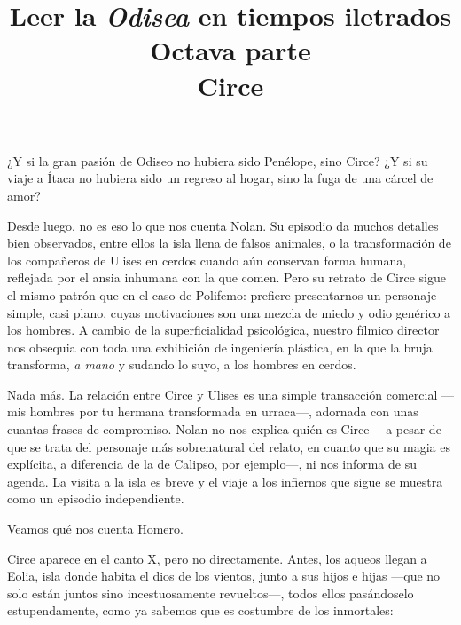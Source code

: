 \documentclass[11pt,a4paper]{article}
\title{Leer la \emph{Odisea} en tiempos iletrados \\ Octava parte \\ Circe}
\author{}
\date{}
\begin{document}
\maketitle

¿Y si la gran pasión de Odiseo no hubiera sido Penélope, sino Circe? ¿Y si su viaje a Ítaca no hubiera sido un regreso al hogar, sino la fuga de una cárcel de amor?

Desde luego, no es eso lo que nos cuenta Nolan. Su episodio da muchos detalles bien observados, entre ellos la isla llena de falsos animales, o la transformación de los compañeros de Ulises en cerdos cuando aún conservan forma humana, reflejada por el ansia inhumana con la que comen. Pero su retrato de Circe sigue el mismo patrón que en el caso de Polifemo: prefiere presentarnos un personaje simple, casi plano, cuyas motivaciones son una mezcla de miedo y odio genérico a los hombres. A cambio de la superficialidad psicológica, nuestro fílmico director nos obsequia con toda una exhibición de ingeniería plástica, en la que la bruja transforma, \emph{a mano} y sudando lo suyo, a los hombres en cerdos.

Nada más. La relación entre Circe y Ulises es una simple transacción comercial ---mis hombres por tu hermana transformada en urraca---, adornada con unas cuantas frases de compromiso. Nolan no nos explica quién es Circe ---a pesar de que se trata del personaje más sobrenatural del relato, en cuanto que su magia es explícita, a diferencia de la de Calipso, por ejemplo---, ni nos informa de su agenda. La visita a la isla es breve y el viaje a los infiernos que sigue se muestra como un episodio independiente.

Veamos qué nos cuenta Homero.

Circe aparece en el canto X, pero no directamente. Antes, los aqueos llegan a Eolia, isla donde habita el dios de los vientos, junto a sus hijos e hijas ---que no solo están juntos sino incestuosamente revueltos---, todos ellos pasándoselo estupendamente, como ya sabemos que es costumbre de los inmortales:
\end{document}
